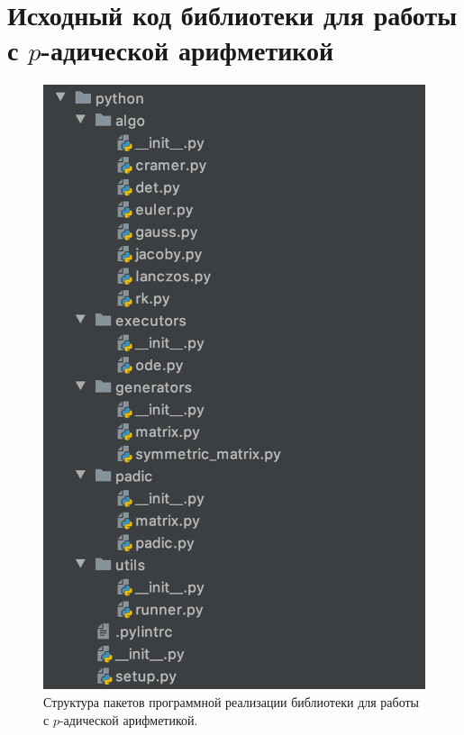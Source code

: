 \documentclass[master, och, diploma, times]{sty/SCWorks}
\theoremstyle{plain}
\theoremstyle{definition}
\numberwithin{equation}{section}
\begin{document}



\appendix

\section{Исходный код библиотеки для работы с $p$-адической арифметикой}




\begin{figure}[H]
\centerline{
\includegraphics[width=0.4\linewidth]{images/code_struct}}
\caption{Структура пакетов программной реализации библиотеки для работы с $p$-адической арифметикой.}
\label{img:code:struct}
\end{figure}








\end{document}

